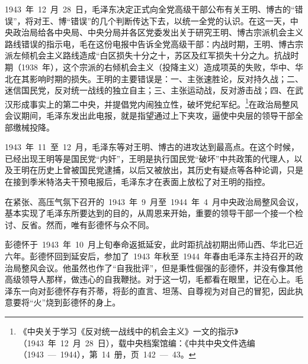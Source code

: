 1943~年~12~月~28~日，毛泽东决定正式向全党高级干部公布有关王明、博古的“错误”，将对王、博“错误”的几个判断传达下去，以统一全党的认识。在这一天，中央政治局给各中央局、中央分局并各区党委发出关于研究王明、博古宗派机会主义路线错误的指示电，毛在这份电报中告诉全党高级干部：内战时期，王明、博古宗派左倾机会主义路线造成“白区损失十分之十，苏区及红军损失十分之九。抗战时期（1938~年），这个宗派的右倾机会主义（投降主义）造成项英的失败，华中、华北在其影响时期的损失。王明的主要错误是：一、主张速胜论，反对持久战；二、迷信国民党，反对统一战线的独立自主；三、主张运动战，反对游击战；四、在武汉形成事实上的第二中央，并提倡党内闹独立性，破坏党纪军纪。\footnote{《中央关于学习《反对统一战线中的机会主义》一文的指示》（1943~年~12~月~28~日），载中央档案馆编：《中共中央文件选编（1943~—~1944），第~14~册，页~142~—~43。}在政治局整风会议期间，毛泽东发出此电报，就是指望通过上下夹攻，逼使中央层的领导干部全部缴械投降。

1943~年~11~至~12~月，毛泽东等对王明、博古的进攻达到最高点。在这个时候，已经出现王明等是国民党“内奸”，王明是执行国民党“破坏”中共政策的代理人，以及王明在历史上曾被国民党逮捕，以后又被放出，其历史有疑点等各种论调，只是在接到季米特洛夫干预电报后，毛泽东才在表面上放松了对王明的指控。

在紧张、高压气氛下召开的~1943~年~9~月至~1944~年~4~月中央政治局整风会议，基本实现了毛泽东所要达到的目的，从周恩来开始，重要的领导干部一个接一个检讨、反省。然而，唯有彭德怀与众不同。

彭德怀于~1943~年~10~月上旬奉命返抵延安，此时距抗战初期出师山西、华北已近六年。彭德怀回到延安后，参加了~1943~年秋至~1944~年春由毛泽东主持召开的政治局整风会议。他虽然也作了“自我批评”，但是秉性倔强的彭德怀，并没有像其他高级领导人那样，做违心的自我鞭挞。对于这一切，毛都看在眼里，记在心上。毛泽东一向对彭德怀存有芥蒂，将彭的直言、坦荡、自尊视为对自己的冒犯，因此执意要将“火”烧到彭德怀的身上。

